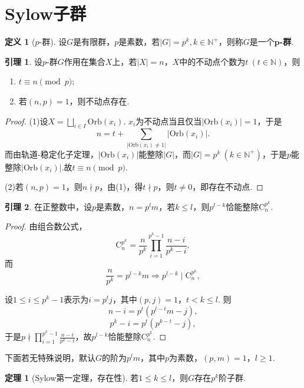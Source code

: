 \documentclass[12pt]{ctexart}
\theoremstyle{definition}
\newtheorem{definition}{定义}[section]
\newtheorem{theorem}{定理}[section]
\newtheorem{lemma}{引理}[section]
\theoremstyle{plain}
\newcommand{\Orb}{\mathrm{Orb}}
\begin{document}
\section{Sylow子群}
\begin{definition}[$p$-群]
	设$G$是有限群，$p$是素数，若$|G|=p^k,k\in\mathbb{N}^+$，则称$G$是一个$\boldsymbol{p}$\textbf{-群}.
\end{definition}
\begin{lemma}\label{fixedpoint}
	设$p$-群$G$作用在集合$X$上，若$|X|=n$，$X$中的不动点个数为$t\ (t\in\mathbb{N})$，则
	\begin{enumerate}[(1)]
		\item $t\equiv n\pmod p$;
		\item 若$(n,p)=1$，则不动点存在.
	\end{enumerate}
\end{lemma}
\begin{proof}
	(1)设$X=\displaystyle\bigsqcup_{i\in I}\Orb(x_i)$. $x_i$为不动点当且仅当$|\Orb(x_i)|=1$，于是
	$$n=t+\sum_{|\Orb(x_i)\neq 1|}|\Orb(x_i)|.$$
	而由轨道-稳定化子定理，$|\Orb(x_i)|$能整除$|G|$，而$|G|=p^k\ (k\in\mathbb{N}^{+})$，于是$p$能整除$|\Orb(x_i)|$.故$t\equiv n\pmod p$.
	
	(2)若$(n,p)=1$，则$n\nmid p$，由(1)，得$t\nmid p$，则$t\neq 0$，即存在不动点.
\end{proof}
\begin{lemma}\label{divide}
	在正整数中，设$p$是素数，$n=p^lm$，若$k\leqslant l$，则$p^{l-k}$恰能整除$\mathrm{C}_{n}^{p^k}$.
\end{lemma}
\begin{proof}
	由组合数公式，
	$$\mathrm{C}_{n}^{p^k}=\frac{n}{p^k}\prod_{i=1}^{p^k-1}\frac{n-i}{p^k-i},$$
	而
	$$\frac{n}{p^k}=p^{l-k}m\Rightarrow p^{l-k}\mid\mathrm{C}_{n}^{p^k},$$
	
	设$1\leqslant i\leqslant p^k-1$表示为$i=p^tj$，其中$(p,j)=1$，$t<k\leqslant l$. 则
	$$n-i=p^t\left(p^{l-t}m-j\right),$$
	$$p^{k}-i=p^t\left(p^{k-t}-j\right),$$
	于是$p\nmid\prod_{i=1}^{p^k-1}\frac{n-i}{p^k-i}$，故$p^{l-k}$恰能整除$\mathrm{C}_{n}^{p^k}$.
\end{proof}
下面若无特殊说明，默认$G$的阶为$p^lm$，其中$p$为素数，$(p,m)=1$，$l\geqslant 1$.
\begin{theorem}[Sylow第一定理，存在性]
	若$1\leqslant k\leqslant l$，则$G$存在$p^k$阶子群.
\end{theorem}
\end{document}
